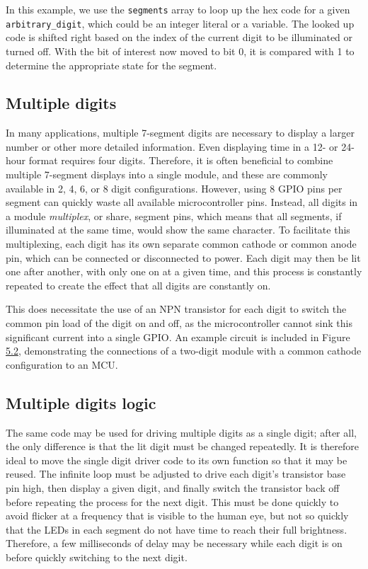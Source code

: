 \documentclass[
  9pt,
  letterpaper,
  abstract,
  titlepage]{scrbook}
\begin{document}
In this example, we use the \texttt{segments} array to loop up the hex
code for a given \texttt{arbitrary\_digit}, which could be an integer
literal or a variable. The looked up code is shifted right based on the
index of the current digit to be illuminated or turned off. With the bit
of interest now moved to bit 0, it is compared with 1 to determine the
appropriate state for the segment.

\subsection{Multiple digits}\label{multiple-digits}

In many applications, multiple 7-segment digits are necessary to display
a larger number or other more detailed information. Even displaying time
in a 12- or 24-hour format requires four digits. Therefore, it is often
beneficial to combine multiple 7-segment displays into a single module,
and these are commonly available in 2, 4, 6, or 8 digit configurations.
However, using 8 GPIO pins per segment can quickly waste all available
microcontroller pins. Instead, all digits in a module \emph{multiplex},
or share, segment pins, which means that all segments, if illuminated at
the same time, would show the same character. To facilitate this
multiplexing, each digit has its own separate common cathode or common
anode pin, which can be connected or disconnected to power. Each digit
may then be lit one after another, with only one on at a given time, and
this process is constantly repeated to create the effect that all digits
are constantly on.

This does necessitate the use of an NPN transistor for each digit to
switch the common pin load of the digit on and off, as the
microcontroller cannot sink this significant current into a single GPIO.
An example circuit is included in Figure
\hyperref[fig:multi-digit-7-segment-schematic]{5.2}, demonstrating the
connections of a two-digit module with a common cathode configuration to
an MCU.

\subsection{Multiple digits logic}\label{multiple-digits-logic}

The same code may be used for driving multiple digits as a single digit;
after all, the only difference is that the lit digit must be changed
repeatedly. It is therefore ideal to move the single digit driver code
to its own function so that it may be reused. The infinite loop must be
adjusted to drive each digit's transistor base pin high, then display a
given digit, and finally switch the transistor back off before repeating
the process for the next digit. This must be done quickly to avoid
flicker at a frequency that is visible to the human eye, but not so
quickly that the LEDs in each segment do not have time to reach their
full brightness. Therefore, a few milliseconds of delay may be necessary
while each digit is on before quickly switching to the next digit.
\end{document}
